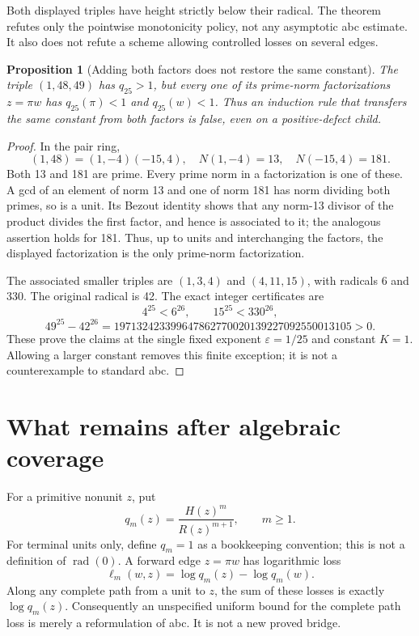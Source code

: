 \documentclass[11pt]{article}
\newtheorem{proposition}[theorem]{Proposition}
\theoremstyle{definition}
\theoremstyle{remark}
\newcommand{\rad}{\operatorname{rad}}
\begin{document}
Both displayed triples have height strictly below their radical. The theorem refutes only the pointwise monotonicity policy, not any asymptotic abc estimate. It also does not refute a scheme allowing controlled losses on several edges.

\begin{proposition}[Adding both factors does not restore the same constant]\label{prop:both}
The triple $(1,48,49)$ has $q_{25}>1$, but every one of its prime-norm factorizations $z=\pi w$ has $q_{25}(\pi)<1$ and $q_{25}(w)<1$. Thus an induction rule that transfers the same constant from both factors is false, even on a positive-defect child.
\end{proposition}
\begin{proof}
In the pair ring,
\[
(1,48)=(1,-4)(-15,4),\quad N(1,-4)=13,\quad N(-15,4)=181.
\]
Both 13 and 181 are prime. Every prime norm in a factorization is one of these. A gcd of an element of norm 13 and one of norm 181 has norm dividing both primes, so is a unit. Its Bezout identity shows that any norm-13 divisor of the product divides the first factor, and hence is associated to it; the analogous assertion holds for 181. Thus, up to units and interchanging the factors, the displayed factorization is the only prime-norm factorization.

The associated smaller triples are $(1,3,4)$ and $(4,11,15)$, with radicals 6 and 330. The original radical is 42. The exact integer certificates are
\[
4^{25}<6^{26},\qquad 15^{25}<330^{26},
\]
\[
49^{25}-42^{26}=197132423399647862770020139227092550013105>0.
\]
These prove the claims at the single fixed exponent $\varepsilon=1/25$ and constant $K=1$. Allowing a larger constant removes this finite exception; it is not a counterexample to standard abc.
\end{proof}

\section{What remains after algebraic coverage}
For a primitive nonunit $z$, put
\[
q_m(z)=\frac{H(z)^m}{R(z)^{m+1}},\qquad m\ge1.
\]
For terminal units only, define $q_m=1$ as a bookkeeping convention; this is not a definition of $\rad(0)$. A forward edge $z=\pi w$ has logarithmic loss
\[
\ell_m(w,z)=\log q_m(z)-\log q_m(w).
\]
Along any complete path from a unit to $z$, the sum of these losses is exactly $\log q_m(z)$. Consequently an unspecified uniform bound for the complete path loss is merely a reformulation of abc. It is not a new proved bridge.
\end{document}
